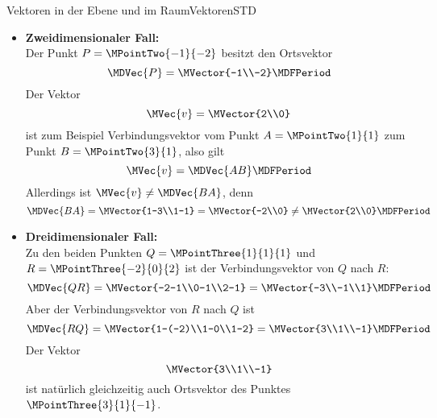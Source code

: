\begin{MXContent}{Vektoren in der Ebene und im Raum}{Vektoren}{STD}
\begin{MInfo}
\begin{itemize}
\begin{center}
{
}
\end{center}

\end{itemize}
 
\end{MInfo}

\begin{MExample}
\begin{itemize}
 \item \textbf{Zweidimensionaler Fall:}\\
 Der Punkt $P=\MPointTwo{-1}{-2}$ besitzt den Ortsvektor 
 \[
  \MDVec{P} = \MVector{-1\\-2} \MDFPeriod
 \]
 Der Vektor 
 \[
  \MVec{v}=\MVector{2\\0}
 \]
 ist zum Beispiel Verbindungsvektor vom Punkt $A=\MPointTwo{1}{1}$ zum Punkt $B=\MPointTwo{3}{1}$, also gilt
 \[
  \MVec{v}=\MDVec{A B} \MDFPeriod 
 \]
 Allerdings ist $\MVec{v}\neq\MDVec{B A}$, denn 
 \[
  \MDVec{B A} = \MVector{1-3\\1-1} = \MVector{-2\\0}\neq\MVector{2\\0} \MDFPeriod
 \]
 \item \textbf{Dreidimensionaler Fall:}\\
 Zu den beiden Punkten $Q=\MPointThree{1}{1}{1}$ und $R=\MPointThree{-2}{0}{2}$ ist der Verbindungsvektor von $Q$ nach $R$:
 \[
  \MDVec{Q R}=\MVector{-2-1\\0-1\\2-1}= \MVector{-3\\-1\\1}\MDFPeriod
 \]
 Aber der Verbindungsvektor von $R$ nach $Q$ ist
 \[
  \MDVec{R Q}=\MVector{1-(-2)\\1-0\\1-2}=\MVector{3\\1\\-1} \MDFPeriod
 \]
 Der Vektor 
 \[
  \MVector{3\\1\\-1}
 \]
 ist natürlich gleichzeitig auch Ortsvektor des Punktes $\MPointThree{3}{1}{-1}$.
\end{itemize}
 

\end{MExample}
\end{MXContent}
